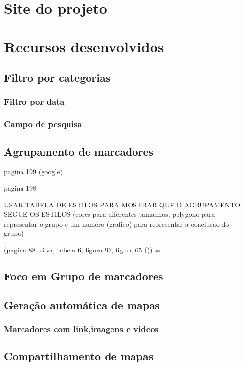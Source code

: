 \section{Site do projeto}
\section{Recursos desenvolvidos}
\subsection{Filtro por categorias}
\subsubsection{Filtro por data}
\subsubsection{Campo de pesquisa}

\subsection{Agrupamento de marcadores}

		pagina 199 (google)
  
  	 
 pagina 198

 USAR TABELA DE ESTILOS PARA MOSTRAR QUE O AGRUPAMENTO SEGUE OS ESTILOS (cores para diferentes tamanhos, polygono para representar o grupo e um numero (grafico) para representar a conclusao do grupo)
 
 (pagina 88 ,silva, tabela 6, figura 93, figura 65 ())
ss		
\subsection{Foco em Grupo de marcadores}

\subsection{Geração automática de mapas}
\subsubsection{Marcadores com link,imagens e videos}
\subsection{Compartilhamento de mapas}

